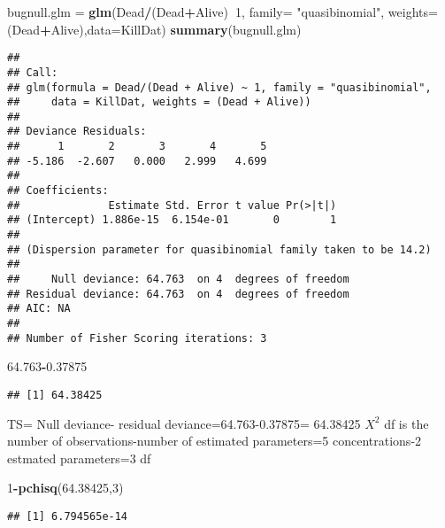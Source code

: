 \documentclass[]{article}
\newenvironment{Shaded}{\begin{snugshade}}{\end{snugshade}}
\newcommand{\KeywordTok}[1]{\textcolor[rgb]{0.13,0.29,0.53}{\textbf{#1}}}
\newcommand{\DataTypeTok}[1]{\textcolor[rgb]{0.13,0.29,0.53}{#1}}
\newcommand{\DecValTok}[1]{\textcolor[rgb]{0.00,0.00,0.81}{#1}}
\newcommand{\FloatTok}[1]{\textcolor[rgb]{0.00,0.00,0.81}{#1}}
\newcommand{\StringTok}[1]{\textcolor[rgb]{0.31,0.60,0.02}{#1}}
\newcommand{\OperatorTok}[1]{\textcolor[rgb]{0.81,0.36,0.00}{\textbf{#1}}}
\newcommand{\NormalTok}[1]{#1}
\begin{document}
\begin{Shaded}
\begin{Highlighting}[]
\NormalTok{bugnull.glm =}\StringTok{ }\KeywordTok{glm}\NormalTok{(Dead}\OperatorTok{/}\NormalTok{(Dead}\OperatorTok{+}\NormalTok{Alive)}\OperatorTok{~}\DecValTok{1}\NormalTok{, }\DataTypeTok{family=} \StringTok{"quasibinomial"}\NormalTok{, }\DataTypeTok{weights=}\NormalTok{(Dead}\OperatorTok{+}\NormalTok{Alive),}\DataTypeTok{data=}\NormalTok{KillDat)}
\KeywordTok{summary}\NormalTok{(bugnull.glm)}
\end{Highlighting}
\end{Shaded}

\begin{verbatim}
## 
## Call:
## glm(formula = Dead/(Dead + Alive) ~ 1, family = "quasibinomial", 
##     data = KillDat, weights = (Dead + Alive))
## 
## Deviance Residuals: 
##      1       2       3       4       5  
## -5.186  -2.607   0.000   2.999   4.699  
## 
## Coefficients:
##              Estimate Std. Error t value Pr(>|t|)
## (Intercept) 1.886e-15  6.154e-01       0        1
## 
## (Dispersion parameter for quasibinomial family taken to be 14.2)
## 
##     Null deviance: 64.763  on 4  degrees of freedom
## Residual deviance: 64.763  on 4  degrees of freedom
## AIC: NA
## 
## Number of Fisher Scoring iterations: 3
\end{verbatim}

\begin{Shaded}
\begin{Highlighting}[]
\FloatTok{64.763}\OperatorTok{-}\FloatTok{0.37875}
\end{Highlighting}
\end{Shaded}

\begin{verbatim}
## [1] 64.38425
\end{verbatim}

TS= Null deviance- residual deviance=64.763-0.37875= 64.38425 \(X^2\) df
is the number of observations-number of estimated parameters=5
concentrations-2 estmated parameters=3 df

\begin{Shaded}
\begin{Highlighting}[]
\DecValTok{1}\OperatorTok{-}\KeywordTok{pchisq}\NormalTok{(}\FloatTok{64.38425}\NormalTok{,}\DecValTok{3}\NormalTok{)}
\end{Highlighting}
\end{Shaded}

\begin{verbatim}
## [1] 6.794565e-14
\end{verbatim}
\end{document}
